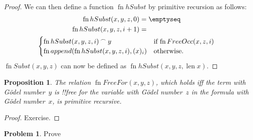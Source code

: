 \documentclass[10pt,a4paper]{article}
\makeatletter
\theoremstyle{plain}
\newtheorem{prop}[thm]{Proposition}
\theoremstyle{definition}
\newtheorem{prob}{Problem}[section]
\theoremstyle{remark}
\newcommand*{\ollabel}[1]{\label{#1}}
\newcommand{\olref}{\@ifnextchar[{\olref@i}{\olref@final}}
\def\olref@i[#1]{\@ifnextchar[{\olref@ii}{\olref@final}}
\def\olref@ii[#1]{\@ifnextchar[{\olref@iii}{\olref@final}}
\def\olref@iii[#1]{\olref@final}
\def\olref@final#1{\ref{#1}}
\providecommand{\len}{\operatorname{len}}
\providecommand{\concat}{\mathbin{{}^\frown}}
\providecommand{\fn}{\operatorname{fn}}
\makeatother
\begin{document}
\begin{proof}
We can then define a function $\fn{hSubst}$ by primitive recursion as
follows:
\begin{multline*}
\begin{aligned}
\fn{hSubst}(x, y, z, 0) & = \emptyseq \\
\fn{hSubst}(x, y, z, i+1) & =
\end{aligned}\\
\begin{cases}
\fn{hSubst}(x, y, z, i) \concat y & \text{if $\fn{FreeOcc}(x, z, i)$} \\
\fn{append}(\fn{hSubst}(x, y, z, i), (x)_{i}) & \text{otherwise.}
\end{cases}
\end{multline*}
$\fn{Subst}(x, y, z)$ can now be defined as $\fn{hSubst}(x, y, z, \len{x})$.
\end{proof}

\begin{prop}
\ollabel{prop:free-for}
The relation $\fn{FreeFor}(x, y, z)$, which holds iff the term with
G\"odel number~$y$ is !!{free for} the variable with G\"odel
number~$z$ in the formula with G\"odel number~$x$, is primitive
recursive.
\end{prop}

\begin{proof} Exercise. \end{proof}

\begin{prob}
Prove \olref[inc][art][sub]{prop:free-for}
\end{prob}
\end{document}
